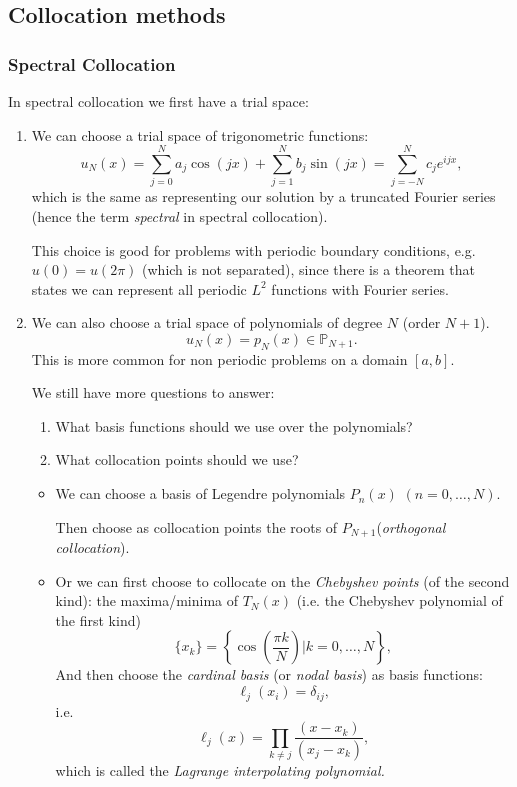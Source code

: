 \documentclass[12pt, a4paper]{article}
\theoremstyle{definition}
\theoremstyle{remark}
\numberwithin{equation}{section}
\begin{document}
\newpage
\subsection{Collocation methods}

\subsubsection{Spectral Collocation}
In spectral collocation we first have a trial space:
\begin{enumerate}
\item We can choose a trial space of trigonometric functions:
\begin{equation*}
u_N(x) = \sum_{j=0}^N a_j \cos(jx) + \sum_{j=1}^N b_j\sin(jx) = \sum_{j=-N}^{N} c_j e^{i jx},
\end{equation*}
which is the same as representing our solution by a truncated Fourier series (hence the term \emph{spectral} in spectral collocation).

This choice is good for problems with periodic boundary conditions, e.g.\ $u(0)=u(2\pi)$ (which is not separated), 
since there is a theorem that states we can represent all periodic $L^2$ functions with Fourier series.

\item We can also choose a trial space of polynomials of degree $N$ (order $N+1$).
\begin{equation*}
u_N(x) =p_{N}(x) \in \mathbb{P}_{N+1}.
\end{equation*}
This is more common for non periodic problems on a domain $[a,b]$.

We still have more questions to answer:
\begin{enumerate}
\item What basis functions should we use over the polynomials?
\item What collocation points should we use?
\end{enumerate}

\begin{itemize}
\item We can choose a basis of Legendre polynomials $P_n(x)$ $(n=0,\dots,N)$.

Then choose as collocation points the roots of $P_{N+1}$(\emph{orthogonal collocation}).

\item Or we can first choose to collocate on the \emph{Chebyshev points} (of the second kind): the maxima/minima of $T_N(x)$ (i.e. the Chebyshev polynomial of the first kind)
\begin{equation*}
\{x_k\} = \left\{\cos\left(\frac{\pi k}{N}\right) \bigg| k=0, \dots, N \right\},
\end{equation*}
And then choose the \emph{cardinal basis} (or \emph{nodal basis}) as basis functions:
\begin{equation*}
\ell_j(x_i)=\delta_{ij},
\end{equation*}
i.e.
\begin{equation*}
\ell_j(x)=\prod_{k \neq j} \frac{(x-x_k)}{(x_j-x_k)},
\end{equation*}
which is called the \emph{Lagrange interpolating polynomial.}


\end{itemize}
\end{enumerate}
\end{document}
